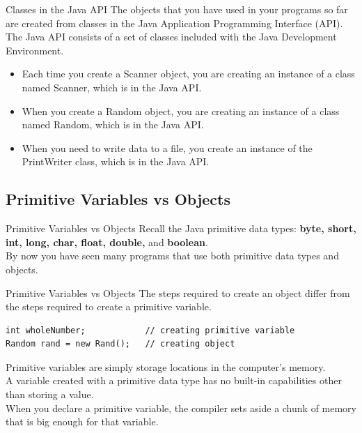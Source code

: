 \documentclass[11pt]{beamer}
\begin{document}
\begin{frame}{Classes in the Java API}
    The objects that you have used in your programs so far are created from
    classes in the Java Application Programming Interface (API).
    \\ \vspace{1em}
    The Java API consists of a set of classes included with the Java Development Environment. 
    \\ \vspace{1em}
    \begin{itemize}
        \item Each time you create a Scanner object, you are creating an instance of a class named Scanner, which is in the Java API.
        \item  When you create a Random object, you are creating an instance of a class named Random, which is in the Java API.
        \item When you need to write data to a file, you create an instance of the PrintWriter class, which is in the Java API.
    \end{itemize}
\end{frame}

\subsection{Primitive Variables vs Objects}
\begin{frame}[fragile]{Primitive Variables vs Objects}
    Recall the Java primitive data types: \textbf{byte, short, int, long, char, float, double,} and \textbf{boolean}.
    \\ \vspace{1em}
    By now you have seen many programs that use both primitive data types and objects. 
\end{frame}

\begin{frame}[fragile]{Primitive Variables vs Objects}
    The steps required to create an object differ from the steps required to create a primitive variable.
    \begin{lstlisting}
int wholeNumber;            // creating primitive variable
Random rand = new Rand();   // creating object
    \end{lstlisting}
    Primitive variables are simply storage locations in the computer’s memory. \\
    \vspace{1em}
    A variable created with a primitive data type has no built-in capabilities other than storing a value. \\
    \vspace{1em}
    When you declare a primitive variable, the compiler sets aside a chunk of memory that is big enough for that variable.
\end{frame}
\end{document}
